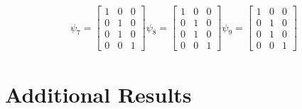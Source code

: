 \begin{align}
\psi_{7} =
\begin{bmatrix}
1 & 0 & 0 \\
0 & 1 & 0 \\
0 & 1 & 0 \\
0 & 0 & 1
\end{bmatrix}
\psi_{8} =
\begin{bmatrix}
1 & 0 & 0 \\
0 & 1 & 0 \\
0 & 1 & 0 \\
0 & 0 & 1
\end{bmatrix}
\psi_{9} =
\begin{bmatrix}
1 & 0 & 0 \\
0 & 1 & 0 \\
0 & 1 & 0 \\
0 & 0 & 1
\end{bmatrix}
\end{align}

\chapter{Additional Results}